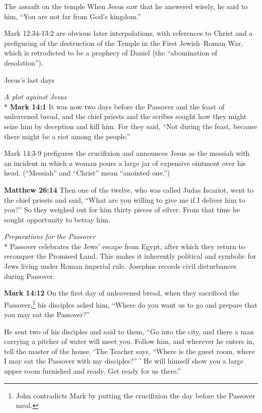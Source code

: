 \documentclass[10pt,twoside]{article} %
\newcommand{\quotesize}{\normalsize{}}
\newcommand{\comm}[1]{\begingroup \color{black!50} #1\endgroup}
\newenvironment{quotetext}{\begingroup\quotesize}{\endgroup}
\newcommand{\intex}[1]{\index[texts]{#1}}
\newcommand{\reftex}[1]{#1\intex{#1}}
\newcommand{\bible}[2]{\begin{quotetext}\textbf{#1}\intex{#1} #2\end{quotetext}}
\newcommand{\matthew}[2]{\bible{Matthew #1}{#2}}
\newcommand{\gospelmark}[2]{\bible{Mark #1}{#2}}
\newcommand{\subhead}[1]{\emph{#1}\\*}
\begin{document}
\begin{section}{The assault on the temple}
{  When Jesus saw that he answered wisely, he said to him, ``You are not far from God's kingdom.'' 
}

\comm{Mark 12:34-13:2 are obvious later interpolations, with references to Christ and a prefiguring of the destruction of the
Temple in the First Jewish–Roman War, which is retrodicted to be a prophecy of 
Daniel (the ``abomination of desolation'').}

\end{section}

\begin{section}{Jesus's last days}

\subhead{A plot against Jesus}
\gospelmark{14:1}{
It was now two days before the Passover and the feast of unleavened bread, and the chief priests and the scribes sought how they might seize him by deception and kill him.   For they said, ``Not during the feast, because there might be a riot among the people.''}

\comm{\reftex{Mark 14:3-9} prefigures the crucifixion and announces Jesus as the messiah with an incident in which a woman pours a large jar of
expensive ointment over his head. (``Messiah'' and ``Christ'' mean ``anointed one.'')}

\matthew{26:14}{
Then one of the twelve, who was called Judas Iscariot, went to the chief priests   and said, ``What are you willing to give me if I deliver him to you?'' So they weighed out for him thirty pieces of silver.   From that time he sought opportunity to betray him.
}

\subhead{Preparations for the Passover}
\comm{Passover celebrates the Jews' escape from Egypt, after which they return to reconquer the Promised Land. This makes it
inherently political and symbolic for Jews living under Roman imperial rule. 
Josephus records civil disturbances during Passover.}

\gospelmark{14:12}{
  On the first day of unleavened bread, when they sacrificed the Passover,\footnote{John contradicts Mark by putting the crucifixion the day before
the Passover meal.}
his disciples asked him, ``Where do you want us to go and prepare that you may eat the Passover?''

  He sent two of his disciples and said to them, ``Go into the city, and there a man carrying a pitcher of water will meet you. Follow him,    and wherever he enters in, tell the master of the house, `The Teacher says, ``Where is the guest room, where I may eat the Passover with my disciples?'' '    He will himself show you a large upper room furnished and ready. Get ready for us there.''

}
\end{section}
\end{document}
